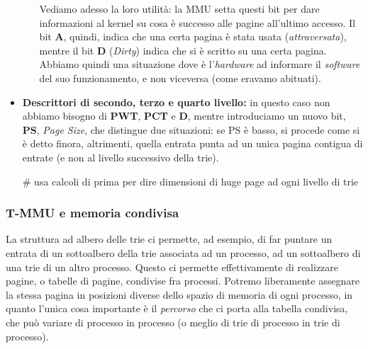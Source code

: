 \documentclass[a4paper,11pt]{article}
\begin{document}
\begin{itemize}
\begin{itemize}
		Vediamo adesso la loro utilità: la MMU setta questi bit per dare informazioni al kernel su cosa è successo alle pagine all'ultimo accesso.
		Il bit \textbf{A}, quindi, indica che una certa pagina è stata usata (\textit{attraversata}), mentre il bit \textbf{D} (\textit{Dirty}) indica che si è scritto su una certa pagina. 
		Abbiamo quindi una situazione dove è l'\textit{hardware} ad informare il \textit{software} del suo funzionamento, e non viceversa (come eravamo abituati). 
\end{itemize}
	\item \textbf{Descrittori di secondo, terzo e quarto livello:}
		in questo caso non abbiamo bisogno di \textbf{PWT}, \textbf{PCT} e \textbf{D}, mentre introduciamo un nuovo bit, \textbf{PS}, \textit{Page Size}, che distingue due situazioni: se PS è basso, si procede come si è detto finora, altrimenti, quella entrata punta ad un unica pagina contigua di entrate (e non al livello successivo della trie).

		# usa calcoli di prima per dire dimensioni di huge page ad ogni livello di trie
\end{itemize}

\subsubsection{T-MMU e memoria condivisa}
La struttura ad albero delle trie ci permette, ad esempio, di far puntare un entrata di un sottoalbero della trie associata ad un processo, ad un sottoalbero di una trie di un altro processo.
Questo ci permette effettivamente di realizzare pagine, o tabelle di pagine, condivise fra processi.
Potremo liberamente assegnare la stessa pagina in posizioni diverse dello spazio di memoria di ogni processo, in quanto l'unica cosa importante è il \textit{percorso} che ci porta alla tabella condivisa, che può variare di processo in processo (o meglio di trie di processo in trie di processo).
\end{document}
